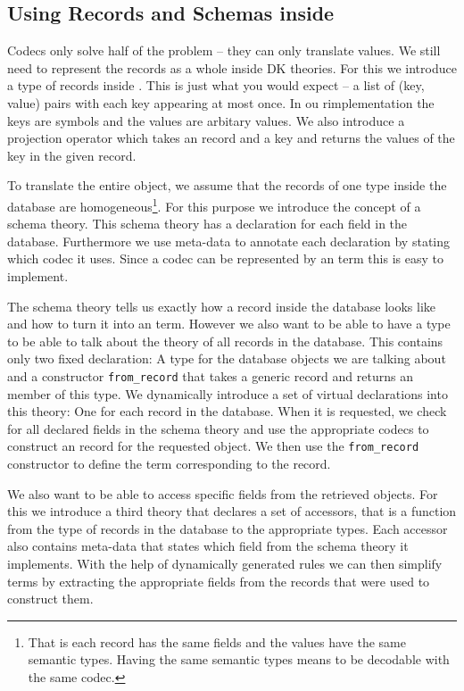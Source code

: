 \subsection{Using Records and Schemas inside \MMT}

Codecs only solve half of the problem -- they can only translate values. We still need to
represent the records as a whole inside DK theories. For this we introduce a type of
records inside \MMT. This is just what you would expect -- a list of (key, value) pairs
with each key appearing at most once. In ou rimplementation the keys are \MMT symbols and
the values are arbitary \MMT values. We also introduce a projection operator which takes
an \MMT record and a key and returns the values of the key in the given record.

To translate the entire object, we assume that the records of one type inside the database
are homogeneous\footnote{That is each record has the same fields and the values have the
  same semantic types. Having the same semantic types means to be decodable with the same
  codec. }. For this purpose we introduce the concept of a schema theory. This schema
theory has a declaration for each field in the database. Furthermore we use meta-data to
annotate each declaration by stating which codec it uses. Since a codec can be represented
by an \MMT term this is easy to implement.

The schema theory tells us exactly how a record inside the database looks like and how to
turn it into an \MMT term. However we also want to be able to have a type to be able to
talk about the theory of all records in the database. This contains only two fixed
declaration: A type for the database objects we are talking about and a constructor
\texttt{from\_record} that takes a generic
record and returns an member of this type. We dynamically introduce a set of virtual
declarations into this theory: One for each record in the database. When it is requested,
we check for all declared fields in the schema theory and use the appropriate codecs to
construct an \MMT record for the requested object. We then use the \texttt{from\_record}
constructor to define the \MMT term corresponding to the record.

We also want to be able to access specific fields from the retrieved objects. For this we
introduce a third theory that declares a set of accessors, that is a function from the
type of records in the database to the appropriate types. Each accessor also contains
meta-data that states which field from the schema theory it implements. With the help of
dynamically generated rules we can then simplify terms by extracting the appropriate
fields from the records that were used to construct them.

